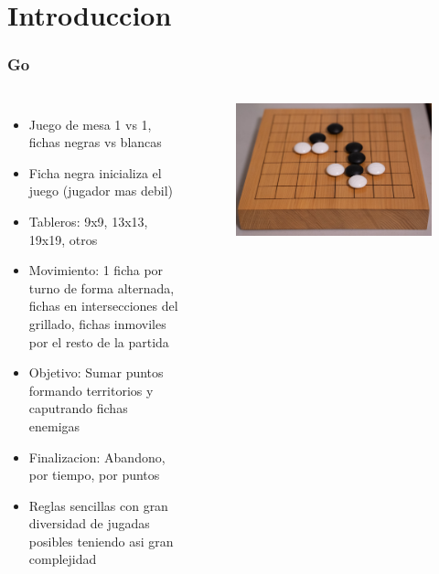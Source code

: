 \documentclass{beamer}
\begin{document}
\section{Introduccion}
\begin{frame}
\frametitle{Go}

\begin{columns}
 
\begin{itemize}
 \item Juego de mesa 1 vs 1, fichas negras vs blancas
 \item Ficha negra inicializa el juego (jugador mas debil)
 \item Tableros: 9x9, 13x13, 19x19, otros
 \item Movimiento: 1 ficha por turno de forma alternada, fichas en intersecciones del grillado, fichas inmoviles por el resto de la partida
 \item Objetivo: Sumar puntos formando territorios y caputrando fichas enemigas
 \item Finalizacion: Abandono, por tiempo, por puntos
 \item Reglas sencillas con gran diversidad de jugadas posibles teniendo asi gran complejidad
\end{itemize}

  \begin{figure}[H]
	\centering
	\includegraphics[width=1.0\textwidth]{../tablero.jpg}
\end{figure}
\end{columns}

\end{frame}
\end{document}
